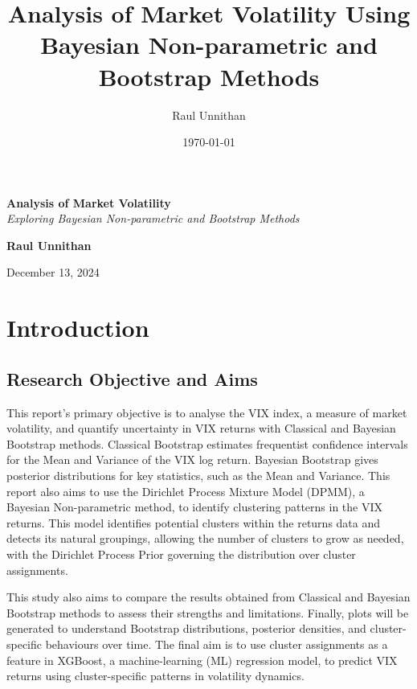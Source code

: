 \documentclass[12pt]{report} %
\title{Analysis of Market Volatility Using Bayesian Non-parametric and Bootstrap Methods}
\author{Raul Unnithan}
\date{\today}
\begin{document}
\begin{titlepage}
    \centering
    \vspace*{1cm} %
    
    {\Huge \textbf{Analysis of Market Volatility}} \\
    \vspace{1cm}
    {\Large \textit{Exploring Bayesian Non-parametric and Bootstrap Methods}}\\ %
    \vspace{2cm}
    
    {\Large \textbf{Raul Unnithan}}\\
    \vspace{1.5cm}
    
    \vfill %
    
    {\large December 13, 2024}\\
\end{titlepage}

\tableofcontents

\chapter{Introduction}

\section{Research Objective and Aims}

This report's primary objective is to analyse the VIX index, a measure of market volatility, and quantify uncertainty in VIX returns with Classical and Bayesian Bootstrap methods.\cite{kuepper2024vix} Classical Bootstrap estimates frequentist confidence intervals for the Mean and Variance of the VIX log return. Bayesian Bootstrap gives posterior distributions for key statistics, such as the Mean and Variance. This report also aims to use the Dirichlet Process Mixture Model (DPMM), a Bayesian Non-parametric method, to identify clustering patterns in the VIX returns. This model identifies potential clusters within the returns data and detects its natural groupings, allowing the number of clusters to grow as needed, with the Dirichlet Process Prior governing the distribution over cluster assignments.\cite{perrakis2024nonparametric} 

This study also aims to compare the results obtained from Classical and Bayesian Bootstrap methods to assess their strengths and limitations. Finally, plots will be generated to understand Bootstrap distributions, posterior densities, and cluster-specific behaviours over time. The final aim is to use cluster assignments as a feature in XGBoost, a machine-learning (ML) regression model, to predict VIX returns using cluster-specific patterns in volatility dynamics.
\end{document}

